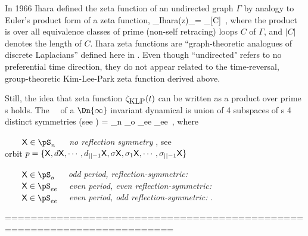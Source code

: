 In 1966 Ihara defined the zeta function of an undirected
graph $\Gamma$ by analogy to Euler's product form of a zeta function,
\beq
\zeta_{\mbox{\footnotesize Ihara}}(z)_\Gamma =
        \prod_{[C]}
\,,
where the product is over all equivalence classes of prime (non-self
retracing) loops $C$ of $\Gamma$, and $|C|$ denotes the length of $C$.
Ihara zeta functions%
are ``graph-theoretic analogues of discrete Laplacians''
defined here in . Even though
``undirected" refers to no preferential
time direction, they do not appear related to
the time-reversal, group-theoretic Kim-Lee-Park zeta function
 derived above.

Still,  the idea that zeta function
$\zeta_{\mbox{\footnotesize KLP}}(t)$ can be written as a product over
prime {\orbit}s holds.
The \statesp\ \pS\ of a $\Dn{\infty}$ invariant dynamical is union of
4 subspaces of {\lattstate}s 4 distinct symmetries
(see )
\beq
\pS = \pS_{n} \cup \pS_{o} \cup \pS_{ee} \cup \pS_{ee}
\,,
where

\noindent
$\qquad \Xx\in\pS_{n}\quad\;$
    {\em no reflection symmetry} ,
                                 see 
\\ \qquad\qquad\qquad
orbit $p=\{\Xx, \shift\Xx, \cdots, \shift_{\cl{}-1}\Xx,
       \Refl\Xx, \Refl_1\Xx, \cdots, \Refl_{\cl{}-1}\Xx\}$

\noindent
$\qquad \Xx\in\pS_{o}\quad\;$
    {\em odd period, reflection-symmetric:} 
\\

\noindent
$\qquad \Xx\in\pS_{ee}\quad$
    {\em even period, even reflection-symmetric:} 
\\

\noindent
$\qquad \Xx\in\pS_{ee}\quad$
    {\em even period, odd reflection-symmetric:} .









\bigskip\bigskip
========================================================================







